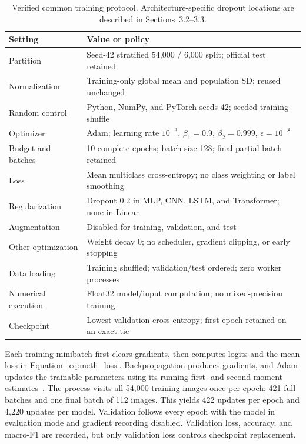 \begin{table}[H]\centering
\caption{Verified common training protocol. Architecture-specific dropout
locations are described in Sections~3.2--3.3.}\label{tab:meth_training}
\begin{tabularx}{\linewidth}{l X}\toprule
Setting & Value or policy\\\midrule
Partition & Seed-42 stratified 54,000 / 6,000 split; official test retained\\
Normalization & Training-only global mean and population SD; reused unchanged\\
Random control & Python, NumPy, and PyTorch seeds 42; seeded training shuffle\\
Optimizer & Adam; learning rate $10^{-3}$, $\beta_1=0.9$, $\beta_2=0.999$, $\epsilon=10^{-8}$\\
Budget and batches & 10 complete epochs; batch size 128; final partial batch retained\\
Loss & Mean multiclass cross-entropy; no class weighting or label smoothing\\
Regularization & Dropout 0.2 in MLP, CNN, LSTM, and Transformer; none in Linear\\
Augmentation & Disabled for training, validation, and test\\
Other optimization & Weight decay 0; no scheduler, gradient clipping, or early stopping\\
Data loading & Training shuffled; validation/test ordered; zero worker processes\\
Numerical execution & Float32 model/input computation; no mixed-precision training\\
Checkpoint & Lowest validation cross-entropy; first epoch retained on an exact tie\\
\bottomrule\end{tabularx}\end{table}

Each training minibatch first clears gradients, then computes logits and the
mean loss in Equation~\ref{eq:meth_loss}. Backpropagation produces gradients,
and Adam updates the trainable parameters using its running first- and
second-moment estimates~\cite{meth_adam}. The process visits all 54,000
training images once per epoch: 421 full batches and one final batch of 112
images. This yields 422 updates per epoch and 4,220 updates per model.
Validation follows every epoch with the model in evaluation mode and gradient
recording disabled. Validation loss, accuracy, and macro-F1 are recorded, but
only validation loss controls checkpoint replacement.

